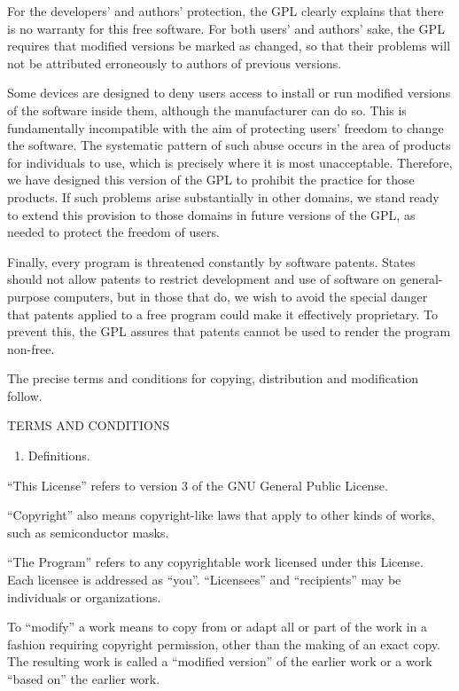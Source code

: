 \documentclass[letterpaper,10pt,english]{sphinxmanual}
\begin{document}
For the developers’ and authors’ protection, the GPL clearly explains
that there is no warranty for this free software.  For both users’ and
authors’ sake, the GPL requires that modified versions be marked as
changed, so that their problems will not be attributed erroneously to
authors of previous versions.

Some devices are designed to deny users access to install or run
modified versions of the software inside them, although the manufacturer
can do so.  This is fundamentally incompatible with the aim of
protecting users’ freedom to change the software.  The systematic
pattern of such abuse occurs in the area of products for individuals to
use, which is precisely where it is most unacceptable.  Therefore, we
have designed this version of the GPL to prohibit the practice for those
products.  If such problems arise substantially in other domains, we
stand ready to extend this provision to those domains in future versions
of the GPL, as needed to protect the freedom of users.

Finally, every program is threatened constantly by software patents.
States should not allow patents to restrict development and use of
software on general-purpose computers, but in those that do, we wish to
avoid the special danger that patents applied to a free program could
make it effectively proprietary.  To prevent this, the GPL assures that
patents cannot be used to render the program non-free.

The precise terms and conditions for copying, distribution and
modification follow.

TERMS AND CONDITIONS
\begin{enumerate}
%
\setcounter{enumi}{-1}
\item {} 
Definitions.

\end{enumerate}

“This License” refers to version 3 of the GNU General Public License.

“Copyright” also means copyright-like laws that apply to other kinds of
works, such as semiconductor masks.

“The Program” refers to any copyrightable work licensed under this
License.  Each licensee is addressed as “you”.  “Licensees” and
“recipients” may be individuals or organizations.

To “modify” a work means to copy from or adapt all or part of the work
in a fashion requiring copyright permission, other than the making of an
exact copy.  The resulting work is called a “modified version” of the
earlier work or a work “based on” the earlier work.
\end{document}
